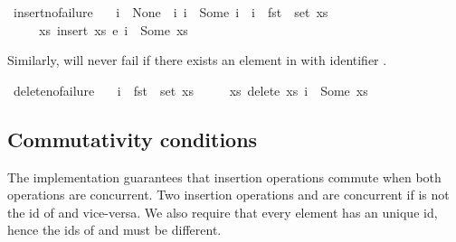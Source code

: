 \documentclass[acmlarge,review,anonymous]{acmart}\settopmatter{printfolios=true}
\begin{document}
\begin{isabellebody}
\isanewline
{}\isamarkupfalse%
\ insert{\isacharunderscore}no{\isacharunderscore}failure{\isacharcolon}\isanewline
\ \ \ {\isachardoublequoteopen}i\ {\isacharequal}\ None\ {\isasymor}\ {\isacharparenleft}{\isasymexists}i{\isacharprime}{\isachardot}\ i\ {\isacharequal}\ Some\ i{\isacharprime}\ {\isasymand}\ i{\isacharprime}\ {\isasymin}\ fst\ {\isacharbackquote}\ set\ xs{\isacharparenright}{\isachardoublequoteclose}\isanewline
\ \ \ \ \ {\isachardoublequoteopen}{\isasymexists}xs{\isacharprime}{\isachardot}\ insert\ xs\ e\ i\ {\isacharequal}\ Some\ xs{\isacharprime}{\isachardoublequoteclose}\isanewline
\end{isabellebody}

Similarly,  will never fail if there exists an element in  with identifier .

\begin{isabellebody}
\isanewline
{}\isamarkupfalse%
\ delete{\isacharunderscore}no{\isacharunderscore}failure{\isacharcolon}\isanewline
\ \ \ {\isachardoublequoteopen}i\ {\isasymin}\ fst\ {\isacharbackquote}\ set\ xs{\isachardoublequoteclose}\isanewline
\ \ \ \ \ {\isachardoublequoteopen}{\isasymexists}xs{\isacharprime}{\isachardot}\ delete\ xs\ i\ {\isacharequal}\ Some\ xs{\isacharprime}{\isachardoublequoteclose}\isanewline
\end{isabellebody}

\subsection{Commutativity conditions}

The implementation guarantees that insertion operations commute when both
operations are concurrent. Two insertion operations 
and  are concurrent if  is not the id of 
and vice-versa. We also require that every element has an unique id, hence the
ids of  and  must be different.
\end{document}
